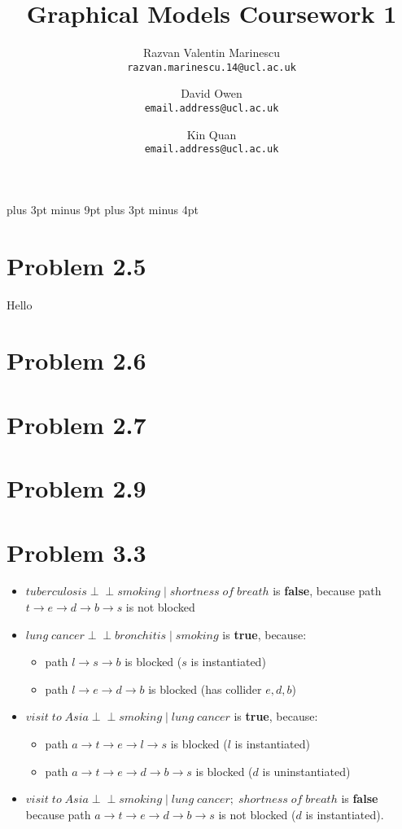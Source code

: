 \documentclass[11pt,a4paper,oneside]{report}
\title{Graphical Models Coursework 1}
\author{
    Razvan Valentin Marinescu\\
    \texttt{razvan.marinescu.14@ucl.ac.uk}
    \and
    David Owen\\
    \texttt{email.address@ucl.ac.uk}
    \and
    Kin Quan\\
    \texttt{email.address@ucl.ac.uk}
}
\newcommand\ci{\perp\!\!\!\perp}
\begin{document}
\belowdisplayskip=12pt plus 3pt minus 9pt
\belowdisplayshortskip=7pt plus 3pt minus 4pt

\maketitle{}


\section*{Problem 2.5}
Hello

\section*{Problem 2.6}


\section*{Problem 2.7}


\section*{Problem 2.9}


\section*{Problem 3.3}

\begin{itemize}
 \item $tuberculosis \ci smoking\;|\; shortness\;of\;breath$ is \textbf{false}, because path $t \to e \to d \to b \to s$ is not blocked
 \item $lung\;cancer \ci  bronchitis\;|\;smoking$ is \textbf{true}, because:
  \begin{itemize}
    \item path $l \to s \to b$ is blocked ($s$ is instantiated)
    \item path $l \to e \to d \to b$ is blocked (has collider ${e,d,b}$)
  \end{itemize}
 \item $visit \; to \; Asia \ci smoking\;|\;lung\;cancer$ is \textbf{true}, because:
   \begin{itemize}
    \item path $a \to t \to e \to l \to s$ is blocked ($l$ is instantiated)
    \item path $a \to t \to e \to d \to b \to s$ is blocked ($d$ is uninstantiated)
  \end{itemize}
 \item $visit \; to \; Asia \ci smoking\;|\;lung \; cancer; \; shortness \; of \; breath$ is \textbf{false} because path $a \to t \to e \to d \to b \to s$ is not blocked ($d$ is instantiated).
\end{itemize}
\end{document}
